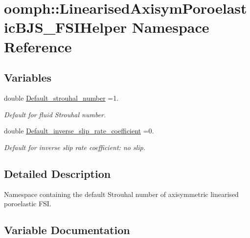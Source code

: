 \hypertarget{namespaceoomph_1_1LinearisedAxisymPoroelasticBJS__FSIHelper}{}\section{oomph\+:\+:Linearised\+Axisym\+Poroelastic\+B\+J\+S\+\_\+\+F\+S\+I\+Helper Namespace Reference}
\label{namespaceoomph_1_1LinearisedAxisymPoroelasticBJS__FSIHelper}
\subsection*{Variables}
\begin{DoxyCompactItemize}
\item 
double \hyperlink{namespaceoomph_1_1LinearisedAxisymPoroelasticBJS__FSIHelper_a5988e6ecbc965011c4cfded713ec68a0}{Default\+\_\+strouhal\+\_\+number} =1.
\begin{DoxyCompactList}\small\item\em Default for fluid Strouhal number. \end{DoxyCompactList}\item 
double \hyperlink{namespaceoomph_1_1LinearisedAxisymPoroelasticBJS__FSIHelper_ab9ad1876a78ec9c7f7baf114560d850c}{Default\+\_\+inverse\+\_\+slip\+\_\+rate\+\_\+coefficient} =0.
\begin{DoxyCompactList}\small\item\em Default for inverse slip rate coefficient\+: no slip. \end{DoxyCompactList}\end{DoxyCompactItemize}


\subsection{Detailed Description}
Namespace containing the default Strouhal number of axisymmetric linearised poroelastic F\+SI. 

\subsection{Variable Documentation}
\mbox{\label{namespaceoomph_1_1LinearisedAxisymPoroelasticBJS__FSIHelper_ab9ad1876a78ec9c7f7baf114560d850c}} 
